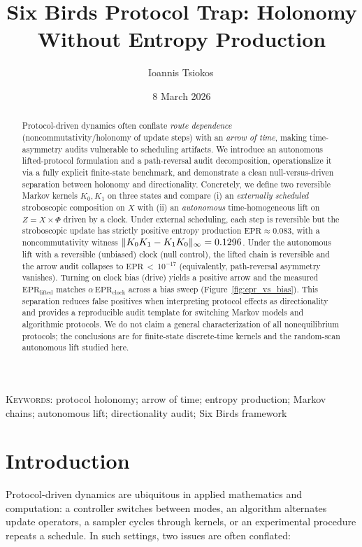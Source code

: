 \documentclass[11pt]{article}
\title{Six Birds Protocol Trap: Holonomy Without Entropy Production}
\author{Ioannis Tsiokos\,\orcidlink{0009-0009-7659-5964}}
\date{8 March 2026}
\newcommand{\EprStrobeShort}{\ensuremath{\approx 0.083}}
\newcommand{\EprLiftedUnbiasedShort}{\ensuremath{\,{<}\,10^{-17}}}
\begin{document}
\maketitle
\thispagestyle{firstpage}

\begin{abstract}
Protocol-driven dynamics often conflate \emph{route dependence} (noncommutativity/holonomy of update steps) with an \emph{arrow of time}, making time-asymmetry audits vulnerable to scheduling artifacts. We introduce an autonomous lifted-protocol formulation and a path-reversal audit decomposition, operationalize it via a fully explicit finite-state benchmark, and demonstrate a clean null-versus-driven separation between holonomy and directionality. Concretely, we define two reversible Markov kernels \(K_0,K_1\) on three states and compare (i) an \emph{externally scheduled} stroboscopic composition on \(X\) with (ii) an \emph{autonomous} time-homogeneous lift on \(Z=X\times\Phi\) driven by a clock. Under external scheduling, each step is reversible but the stroboscopic update has strictly positive entropy production \(\mathrm{EPR}\EprStrobeShort\), with a noncommutativity witness \(\|K_0K_1-K_1K_0\|_\infty=0.1296\). Under the autonomous lift with a reversible (unbiased) clock (null control), the lifted chain is reversible and the arrow audit collapses to \(\mathrm{EPR}\EprLiftedUnbiasedShort\) (equivalently, path-reversal asymmetry vanishes). Turning on clock bias (drive) yields a positive arrow and the measured \(\mathrm{EPR}_{\mathrm{lifted}}\) matches \(\alpha\,\mathrm{EPR}_{\mathrm{clock}}\) across a bias sweep (Figure~\ref{fig:epr_vs_bias}). This separation reduces false positives when interpreting protocol effects as directionality and provides a reproducible audit template for switching Markov models and algorithmic protocols. We do not claim a general characterization of all nonequilibrium protocols; the conclusions are for finite-state discrete-time kernels and the random-scan autonomous lift studied here.
\end{abstract}

\medskip
\noindent\textsc{Keywords:} protocol holonomy; arrow of time; entropy production; Markov chains; autonomous lift; directionality audit; Six Birds framework
 \section{Introduction}

Protocol-driven dynamics are ubiquitous in applied mathematics and computation: a controller switches between modes, an algorithm alternates update operators, a sampler cycles through kernels, or an experimental procedure repeats a schedule. In such settings, two issues are often conflated:
\end{document}
